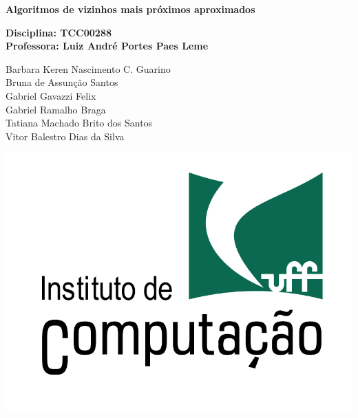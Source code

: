 \documentclass[a4paper,12pt,titlepage]{scrartcl}
\begin{document}
\newcommand{\wk}{\mbox{$\,<$\hspace{-5pt}\footnotesize )$\,$}}




\newtheorem{teo}{Theorem}
\newtheorem{lemma}{Lemma}

\newtheorem{coro}{Corollary}
\newtheorem{prop}{Proposition}
\theoremstyle{definition}
\newtheorem{definition}{Definition}
\theoremstyle{remark}
\newtheorem{remark}{Observação}

\newtheorem{scho}{Scholium}
\newtheorem{open}{Question}
\newtheorem{example}{Example}



\begin{titlepage}
\begin{center}
\vspace*{1cm}
\textbf{\large Algoritmos de vizinhos mais próximos aproximados}\\
\vspace*{2cm}

\end{center}
\textbf{Disciplina: TCC00288}\\
\textbf{Professora: Luiz André Portes Paes Leme}
\begin{center}
\vspace*{6cm}
Barbara Keren Nascimento C. Guarino \\
Bruna de Assunção Santos\\
Gabriel Gavazzi Felix\\
Gabriel Ramalho Braga \\
Tatiana Machado Brito dos Santos\\
Vitor Balestro Dias da Silva

\vspace*{6cm}

\includegraphics[scale=0.2]{logo.png}

\end{center}
\end{titlepage}
\end{document}
